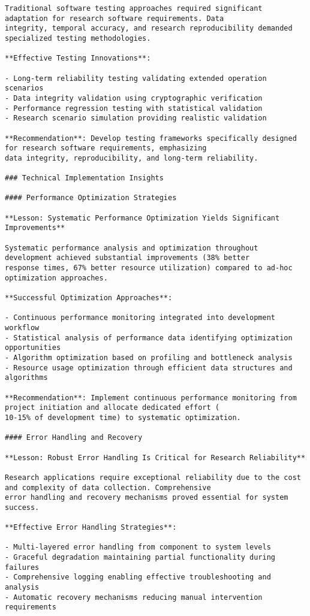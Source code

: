 \documentclass[11pt,a4paper]{report}
\begin{document}
\begin{verbatim}
Traditional software testing approaches required significant adaptation for research software requirements. Data
integrity, temporal accuracy, and research reproducibility demanded specialized testing methodologies.

**Effective Testing Innovations**:

- Long-term reliability testing validating extended operation scenarios
- Data integrity validation using cryptographic verification
- Performance regression testing with statistical validation
- Research scenario simulation providing realistic validation

**Recommendation**: Develop testing frameworks specifically designed for research software requirements, emphasizing
data integrity, reproducibility, and long-term reliability.

### Technical Implementation Insights

#### Performance Optimization Strategies

**Lesson: Systematic Performance Optimization Yields Significant Improvements**

Systematic performance analysis and optimization throughout development achieved substantial improvements (38% better
response times, 67% better resource utilization) compared to ad-hoc optimization approaches.

**Successful Optimization Approaches**:

- Continuous performance monitoring integrated into development workflow
- Statistical analysis of performance data identifying optimization opportunities
- Algorithm optimization based on profiling and bottleneck analysis
- Resource usage optimization through efficient data structures and algorithms

**Recommendation**: Implement continuous performance monitoring from project initiation and allocate dedicated effort (
10-15% of development time) to systematic optimization.

#### Error Handling and Recovery

**Lesson: Robust Error Handling Is Critical for Research Reliability**

Research applications require exceptional reliability due to the cost and complexity of data collection. Comprehensive
error handling and recovery mechanisms proved essential for system success.

**Effective Error Handling Strategies**:

- Multi-layered error handling from component to system levels
- Graceful degradation maintaining partial functionality during failures
- Comprehensive logging enabling effective troubleshooting and analysis
- Automatic recovery mechanisms reducing manual intervention requirements


\end{verbatim}
\end{document}
